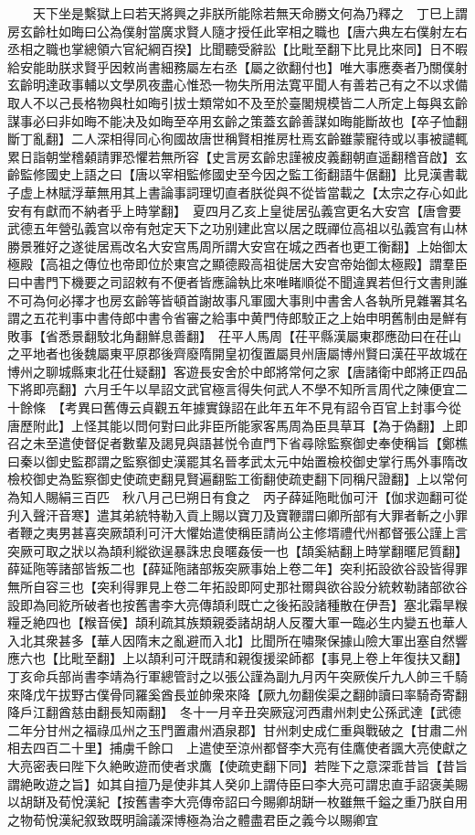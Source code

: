 　　天下坐是繫獄上曰若天將興之非朕所能除若無天命勝文何為乃釋之　丁巳上謂房玄齡杜如晦曰公為僕射當廣求賢人隨才授任此宰相之職也【唐六典左右僕射左右丞相之職也掌總領六官紀綱百揆】比聞聽受辭訟【比毗至翻下比見比來同】日不暇給安能助朕求賢乎因敕尚書細務屬左右丞【屬之欲翻付也】唯大事應奏者乃關僕射玄齡明達政事輔以文學夙夜盡心惟恐一物失所用法寛平聞人有善若己有之不以求備取人不以己長格物與杜如晦引拔士類常如不及至於臺閣規模皆二人所定上每與玄齡謀事必曰非如晦不能决及如晦至卒用玄齡之策蓋玄齡善謀如晦能斷故也【卒子恤翻斷丁亂翻】二人深相得同心徇國故唐世稱賢相推房杜焉玄齡雖蒙寵待或以事被譴輒累日詣朝堂稽顙請罪恐懼若無所容【史言房玄齡忠謹被皮義翻朝直遥翻稽音啟】玄齡監修國史上語之曰【唐以宰相監修國史至今因之監工銜翻語牛倨翻】比見漢書載子虚上林賦浮華無用其上書論事詞理切直者朕從與不從皆當載之【太宗之存心如此安有有獻而不納者乎上時掌翻】　夏四月乙亥上皇徙居弘義宫更名大安宫【唐會要武德五年營弘義宫以帝有尅定天下之功别建此宫以居之既禪位高祖以弘義宫有山林勝景雅好之遂徙居焉改名大安宫馬周所謂大安宫在城之西者也更工衡翻】上始御太極殿【高祖之傳位也帝即位於東宫之顯德殿高祖徙居大安宫帝始御太極殿】謂羣臣曰中書門下機要之司詔敕有不便者皆應論執比來唯睹順從不聞違異若但行文書則誰不可為何必擇才也房玄齡等皆頓首謝故事凡軍國大事則中書舍人各執所見雜署其名謂之五花判事中書侍郎中書令省審之給事中黄門侍郎駮正之上始申明舊制由是鮮有敗事【省悉景翻駮北角翻鮮息善翻】　茌平人馬周【茌平縣漢屬東郡應劭曰在茌山之平地者也後魏屬東平原郡後齊廢隋開皇初復置屬貝州唐屬博州賢曰漢茌平故城在博州之聊城縣東北茌仕疑翻】客遊長安舍於中郎將常何之家【唐諸衛中郎將正四品下將即亮翻】六月壬午以旱詔文武官極言得失何武人不學不知所言周代之陳便宜二十餘條　【考異曰舊傳云貞觀五年據實錄詔在此年五年不見有詔令百官上封事今從唐歷附此】上怪其能以問何對曰此非臣所能家客馬周為臣具草耳【為于偽翻】上即召之未至遣使督促者數輩及謁見與語甚悦令直門下省尋除監察御史奉使稱旨【鄭樵曰秦以御史監郡謂之監察御史漢罷其名晉孝武太元中始置檢校御史掌行馬外事隋改檢校御史為監察御史使疏吏翻見賢遍翻監工銜翻使疏吏翻下同稱尺證翻】上以常何為知人賜絹三百匹　秋八月己巳朔日有食之　丙子薛延陁毗伽可汗【伽求迦翻可從刋入聲汗音寒】遣其弟統特勒入貢上賜以寶刀及寶鞭謂曰卿所部有大罪者斬之小罪者鞭之夷男甚喜突厥頡利可汗大懼始遣使稱臣請尚公主修壻禮代州都督張公謹上言突厥可取之狀以為頡利縱欲逞暴誅忠良暱姦佞一也【頡奚結翻上時掌翻暱尼質翻】薛延陁等諸部皆叛二也【薛延陁諸部叛突厥事始上卷二年】突利拓設欲谷設皆得罪無所自容三也【突利得罪見上卷二年拓設即阿史那社爾與欲谷設分統敕勒諸部欲谷設即為囘紇所破者也按舊書李大亮傳頡利既亡之後拓設諸種散在伊吾】塞北霜旱糇糧乏絶四也【糇音侯】頡利疏其族類親委諸胡胡人反覆大軍一臨必生内變五也華人入北其衆甚多【華人因隋末之亂避而入北】比聞所在嘯聚保據山險大軍出塞自然響應六也【比毗至翻】上以頡利可汗既請和親復援梁師都【事見上卷上年復扶又翻】丁亥命兵部尚書李靖為行軍總管討之以張公謹為副九月丙午突厥俟斤九人帥三千騎來降戊午拔野古僕骨同羅奚酋長並帥衆來降【厥九勿翻俟渠之翻帥讀曰率騎奇寄翻降戶江翻酋慈由翻長知兩翻】　冬十一月辛丑突厥寇河西肅州刺史公孫武達【武德二年分甘州之福祿瓜州之玉門置肅州酒泉郡】甘州刺史成仁重與戰破之【甘肅二州相去四百二十里】捕虜千餘口　上遣使至涼州都督李大亮有佳鷹使者諷大亮使獻之大亮密表曰陛下久絶畋遊而使者求鷹【使疏吏翻下同】若陛下之意深乖昔旨【昔旨謂絶畋遊之旨】如其自擅乃是使非其人癸卯上謂侍臣曰李大亮可謂忠直手詔褒美賜以胡缾及荀悅漢紀【按舊書李大亮傳帝詔曰今賜卿胡缾一枚雖無千鎰之重乃朕自用之物荀悅漢紀叙致既明論議深博極為治之體盡君臣之義今以賜卿宜